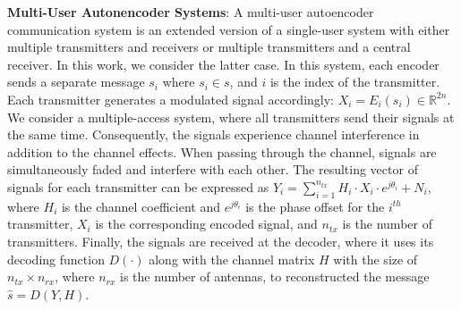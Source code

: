 \textbf{Multi-User Autonencoder Systems}: A multi-user autoencoder communication system is an extended version of a single-user system with either multiple transmitters and receivers or multiple transmitters and a central receiver. In this work, we consider the latter case. In this system, each encoder sends a separate message \(s_i\) where \(s_i \in s\), and \(i\) is the index of the transmitter. Each transmitter generates a modulated signal accordingly: \(X_i = E_i(s_i) \in \mathbb{R}^{2n}\). We consider a multiple-access system, where all transmitters send their signals at the same time. Consequently, the signals experience channel interference in addition to the channel effects. When passing through the channel, signals are simultaneously faded and interfere with each other. The resulting vector of signals for each transmitter can be expressed as \(Y_i = \sum_{i=1}^{n_{tx}} H_i \cdot X_i \cdot e^{j\theta_i} + N_i\), where \(H_i\) is the channel coefficient and \(e^{j\theta_i}\) is the phase offset for the \(i^{th}\) transmitter, \(X_i\) is the corresponding encoded signal, and \(n_{tx}\) is the number of transmitters. Finally, the signals are received at the decoder, where it uses its decoding function \(D(\cdot)\) along with the channel matrix \(H\) with the size of \(n_{tx} \times n_{rx}\), where \(n_{rx}\) is the number of antennas, to reconstructed the message \(\hat{s} = D(Y, H)\).